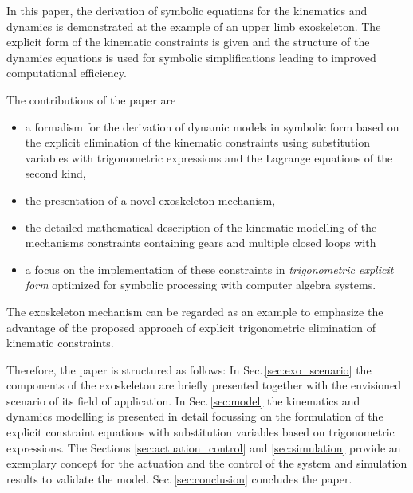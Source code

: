 \documentclass[twocolumn,10pt]{IFTOMM}
\begin{document}
In this paper, the derivation of symbolic equations for the kinematics and dynamics is demonstrated at the example of an upper limb exoskeleton.
The explicit form of the kinematic constraints is given and the structure of the dynamics equations is used for symbolic simplifications leading to improved computational efficiency.

%
%
%
%
%

The contributions of the paper are
\begin{itemize}
    \item a formalism for the derivation of dynamic models in symbolic form based on the explicit elimination of the kinematic constraints using substitution variables with trigonometric expressions and the Lagrange equations of the second kind,
    \item the presentation of a novel exoskeleton mechanism,
    \item the detailed mathematical description of the kinematic modelling of the mechanisms constraints containing gears and multiple closed loops with
    \item a focus on the implementation of these constraints in \emph{trigonometric explicit form} optimized for symbolic processing with computer algebra systems.
\end{itemize}

The exoskeleton mechanism can be regarded as an example to emphasize the advantage of the proposed approach of explicit trigonometric elimination of kinematic constraints.

Therefore, the paper is structured as follows:
In Sec.\,\ref{sec:exo_scenario} the components of the exoskeleton are briefly presented together with the envisioned scenario of its field of application. In Sec.\,\ref{sec:model} the kinematics and dynamics modelling is presented in detail focussing on the formulation of the explicit constraint equations with substitution variables based on trigonometric expressions.
The Sections \ref{sec:actuation_control} and
\ref{sec:simulation} provide an exemplary concept for the actuation and the control of the system and simulation results to validate the model. Sec.\,\ref{sec:conclusion} concludes the paper.
\end{document}
